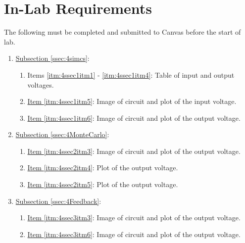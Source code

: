 \section{In-Lab Requirements}

The following must be completed and submitted to Canvas before the start of lab. 

\begin{enumerate}
	\item \hyperref[ssec:4simcs]{Subsection \ref*{ssec:4simcs}}:
		\begin{enumerate}
			\item Items \hyperref[itm:4ssec1itm1]{\ref*{itm:4ssec1itm1}} - \hyperref[itm:4ssec1itm1]{\ref*{itm:4ssec1itm4}}: Table of input and output voltages. 
			\item \hyperref[itm:4ssec1itm5]{Item \ref*{itm:4ssec1itm5}}: Image of circuit and plot of the input voltage.
			\item \hyperref[itm:4ssec1itm6]{Item \ref*{itm:4ssec1itm6}}: Image of circuit and plot of the output voltage.
		\end{enumerate}
	\item \hyperref[{ssec:4MonteCarlo}]{Subsection \ref*{ssec:4MonteCarlo}}:
		\begin{enumerate}
			\item \hyperref[itm:4ssec2itm3]{Item \ref*{itm:4ssec2itm3}}: Image of circuit and plot of the output voltage.
			\item \hyperref[itm:4ssec2itm4]{Item \ref*{itm:4ssec2itm4}}: Plot of the output voltage.
			\item \hyperref[itm:4ssec2itm5]{Item \ref*{itm:4ssec2itm5}}: Plot of the output voltage.
		\end{enumerate}
	\item \hyperref[ssec:4Feedback]{Subsection \ref*{ssec:4Feedback}}:
		\begin{enumerate}
			\item \hyperref[itm:4ssec3itm3]{Item \ref*{itm:4ssec3itm3}}: Image of circuit and plot of the output voltage.
			\item \hyperref[itm:4ssec3itm6]{Item \ref*{itm:4ssec3itm6}}: Image of circuit and plot of the output voltage.
		\end{enumerate}
\end{enumerate}

